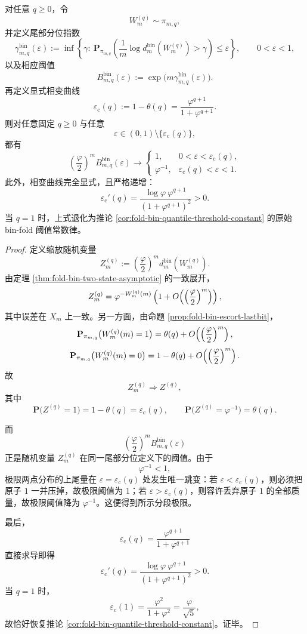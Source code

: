 \begin{theorem}\label{thm:xi-time-part9ob-escort-quantile-phase-diagram}
对任意 \(q\ge 0\)，令
\[
W_m^{(q)}\sim \pi_{m,q},
\]
并定义尾部分位指数
\[
\gamma_{m,q}^{\mathrm{bin}}(\varepsilon)
:=
\inf\left\{
\gamma:\ 
\mathbf P_{\pi_{m,q}}\!\left(
\frac{1}{m}\log d_m^{\mathrm{bin}}(W_m^{(q)})>\gamma
\right)\le \varepsilon
\right\},
\qquad
0<\varepsilon<1,
\]
以及相应阈值
\[
B_{m,q}^{\mathrm{bin}}(\varepsilon)
:=
\exp\!\bigl(m\gamma_{m,q}^{\mathrm{bin}}(\varepsilon)\bigr).
\]
再定义显式相变曲线
\[
\varepsilon_{\mathrm c}(q)
:=
1-\theta(q)
=
\frac{\varphi^{q+1}}{1+\varphi^{q+1}}.
\]
则对任意固定 \(q\ge 0\) 与任意
\[
\varepsilon\in(0,1)\setminus\{\varepsilon_{\mathrm c}(q)\},
\]
都有
\[
\boxed{\;
\left(\frac{\varphi}{2}\right)^m B_{m,q}^{\mathrm{bin}}(\varepsilon)
\longrightarrow
\begin{cases}
1, & 0<\varepsilon<\varepsilon_{\mathrm c}(q),\\[4pt]
\varphi^{-1}, & \varepsilon_{\mathrm c}(q)<\varepsilon<1.
\end{cases}
\;}
\]
此外，相变曲线完全显式，且严格递增：
\[
\varepsilon_{\mathrm c}'(q)
=
\frac{\log\varphi\ \varphi^{q+1}}{(1+\varphi^{q+1})^2}
>
0.
\]
当 \(q=1\) 时，上式退化为推论 \ref{cor:fold-bin-quantile-threshold-constant} 的原始 bin-fold 阈值常数律。
\end{theorem}
\begin{proof}
定义缩放随机变量
\[
Z_m^{(q)}
:=
\left(\frac{\varphi}{2}\right)^m d_m^{\mathrm{bin}}(W_m^{(q)}).
\]
由定理 \ref{thm:fold-bin-two-state-asymptotic} 的一致展开，
\[
Z_m^{(q)}
=
\varphi^{-W_m^{(q)}(m)}
\left(1+O\!\left(\Bigl(\frac{\varphi}{2}\Bigr)^m\right)\right),
\]
其中误差在 \(X_m\) 上一致。另一方面，由命题 \ref{prop:fold-bin-escort-lastbit}，
\[
\mathbf P_{\pi_{m,q}}\bigl(W_m^{(q)}(m)=1\bigr)
=
\theta(q)+O\!\left(\Bigl(\frac{\varphi}{2}\Bigr)^m\right),
\]
\[
\mathbf P_{\pi_{m,q}}\bigl(W_m^{(q)}(m)=0\bigr)
=
1-\theta(q)+O\!\left(\Bigl(\frac{\varphi}{2}\Bigr)^m\right).
\]
故
\[
Z_m^{(q)}\Longrightarrow Z^{(q)},
\]
其中
\[
\mathbf P\bigl(Z^{(q)}=1\bigr)=1-\theta(q)=\varepsilon_{\mathrm c}(q),
\qquad
\mathbf P\bigl(Z^{(q)}=\varphi^{-1}\bigr)=\theta(q).
\]

而
\[
\left(\frac{\varphi}{2}\right)^m B_{m,q}^{\mathrm{bin}}(\varepsilon)
\]
正是随机变量 \(Z_m^{(q)}\) 在同一尾部分位定义下的阈值。由于
\[
\varphi^{-1}<1,
\]
极限两点分布的上尾量在 \(\varepsilon=\varepsilon_{\mathrm c}(q)\) 处发生唯一跳变：若 \(\varepsilon<\varepsilon_{\mathrm c}(q)\)，则必须把原子 \(1\) 一并压掉，故极限阈值为 \(1\)；若 \(\varepsilon>\varepsilon_{\mathrm c}(q)\)，则容许丢弃原子 \(1\) 的全部质量，故极限阈值降为 \(\varphi^{-1}\)。这便得到所示分段极限。

最后，
\[
\varepsilon_{\mathrm c}(q)=\frac{\varphi^{q+1}}{1+\varphi^{q+1}}
\]
直接求导即得
\[
\varepsilon_{\mathrm c}'(q)
=
\frac{\log\varphi\ \varphi^{q+1}}{(1+\varphi^{q+1})^2}>0.
\]
当 \(q=1\) 时，
\[
\varepsilon_{\mathrm c}(1)
=
\frac{\varphi^2}{1+\varphi^2}
=
\frac{\varphi}{\sqrt5},
\]
故恰好恢复推论 \ref{cor:fold-bin-quantile-threshold-constant}。证毕。
\end{proof}

